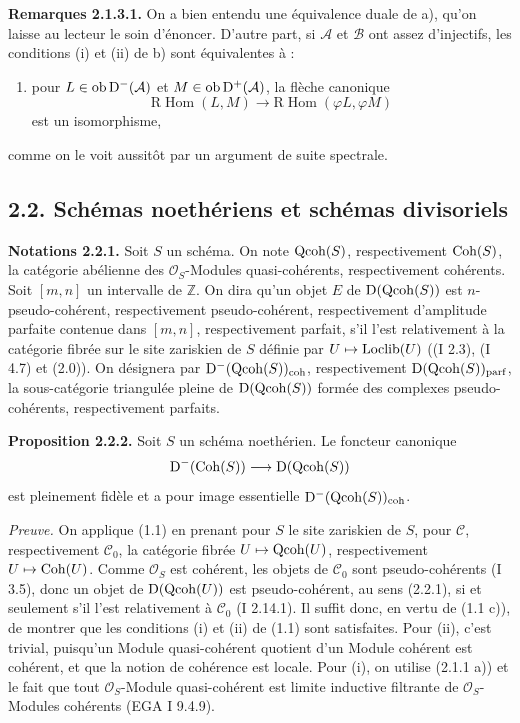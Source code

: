 \documentclass[11pt]{article}
\begin{document}
\textbf{Remarques 2.1.3.1.} On a bien entendu une équivalence duale de a), qu'on laisse au lecteur le soin d'énoncer. D'autre part, si $\mathcal A$ et $\mathcal B$ ont assez d'injectifs, les conditions (i) et (ii) de b) sont équivalentes à :
\begin{enumerate}[label=(\roman*),start=3]
\item pour $L\in\operatorname{ob}\mathrm D^{-}(\mathcal A)$ et $M\in\operatorname{ob}\mathrm D^{+}(\mathcal A)$, la flèche canonique
\[
\mathrm R\!\operatorname{Hom}(L,M)\longrightarrow
\mathrm R\!\operatorname{Hom}(\varphi L,\varphi M)
\]
est un isomorphisme,
\end{enumerate}
comme on le voit aussitôt par un argument de suite spectrale.

\subsection*{2.2. Schémas noethériens et schémas divisoriels}

\textbf{Notations 2.2.1.} Soit $S$ un schéma. On note $\operatorname{Qcoh}(S)$, respectivement $\operatorname{Coh}(S)$, la catégorie abélienne des $\mathcal O_S$-Modules quasi-cohérents, respectivement cohérents. Soit $[m,n]$ un intervalle de $\mathbb Z$. On dira qu'un objet $E$ de $\mathrm D(\operatorname{Qcoh}(S))$ est $n$-pseudo-cohérent, respectivement pseudo-cohérent, respectivement d'amplitude parfaite contenue dans $[m,n]$, respectivement parfait, s'il l'est relativement à la catégorie fibrée sur le site zariskien de $S$ définie par $U\mapsto\operatorname{Loclib}(U)$ ((I 2.3), (I 4.7) et (2.0)). On désignera par $\mathrm D^{-}(\operatorname{Qcoh}(S))_{\operatorname{coh}}$, respectivement $\mathrm D(\operatorname{Qcoh}(S))_{\operatorname{parf}}$, la sous-catégorie triangulée pleine de $\mathrm D(\operatorname{Qcoh}(S))$ formée des complexes pseudo-cohérents, respectivement parfaits.

\textbf{Proposition 2.2.2.} Soit $S$ un schéma noethérien. Le foncteur canonique
\[
\mathrm D^{-}(\operatorname{Coh}(S))\longrightarrow \mathrm D(\operatorname{Qcoh}(S))
\]
est pleinement fidèle et a pour image essentielle $\mathrm D^{-}(\operatorname{Qcoh}(S))_{\operatorname{coh}}$.

\emph{Preuve.} On applique (1.1) en prenant pour $S$ le site zariskien de $S$, pour $\mathcal C$, respectivement $\mathcal C_0$, la catégorie fibrée $U\mapsto\operatorname{Qcoh}(U)$, respectivement $U\mapsto\operatorname{Coh}(U)$. Comme $\mathcal O_S$ est cohérent, les objets de $\mathcal C_0$ sont pseudo-cohérents (I 3.5), donc un objet de $\mathrm D(\operatorname{Qcoh}(U))$ est pseudo-cohérent, au sens (2.2.1), si et seulement s'il l'est relativement à $\mathcal C_0$ (I 2.14.1). Il suffit donc, en vertu de (1.1 c)), de montrer que les conditions (i) et (ii) de (1.1) sont satisfaites. Pour (ii), c'est trivial, puisqu'un Module quasi-cohérent quotient d'un Module cohérent est cohérent, et que la notion de cohérence est locale. Pour (i), on utilise (2.1.1 a)) et le fait que tout $\mathcal O_S$-Module quasi-cohérent est limite inductive filtrante de $\mathcal O_S$-Modules cohérents (EGA I 9.4.9).
\end{document}
